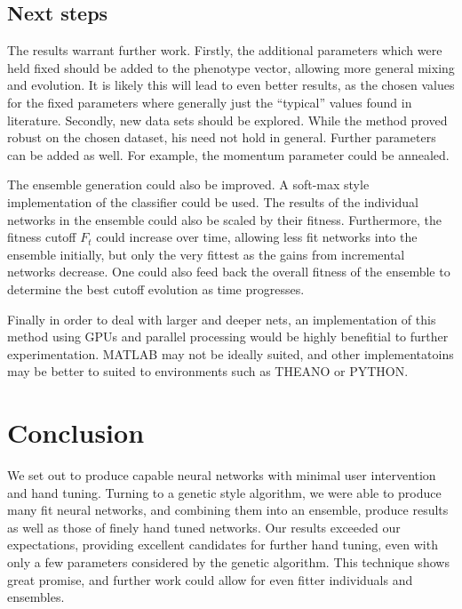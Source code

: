 \documentclass{article}
\DeclareMathOperator{\1}{\mathbbm{1}}
\begin{document}
\subsection{Next steps}
The results warrant further work. Firstly, the additional parameters which were held fixed should be added to the phenotype vector, allowing 
more general mixing and evolution. It is likely this will lead to even better results, as the chosen values for the fixed parameters where 
generally just the ``typical'' values found in literature. Secondly, new data sets should be explored. While the method proved robust on the 
chosen dataset, his need not hold in general. Further parameters can be added as well. For example, the momentum parameter could be annealed. 

The ensemble generation could also be improved. A soft-max style implementation of the classifier could be used. The results of the individual
networks in the ensemble could also be scaled by their fitness. Furthermore, the fitness cutoff $F_t$ could increase over time, allowing less
fit networks into the ensemble initially, but only the very fittest as the gains from incremental networks decrease. One could also feed back 
the overall fitness of the ensemble to determine the best cutoff evolution as time progresses. 

Finally in order to deal with larger and deeper nets, an implementation of this method using GPUs and parallel processing would be highly 
benefitial to further experimentation. MATLAB may not be ideally suited, and other implementatoins may be better to suited to environments 
such as THEANO or PYTHON.


\section{Conclusion}
We set out to produce capable neural networks with minimal user intervention and hand tuning. Turning to a genetic style algorithm, we
were able to produce many fit neural networks, and combining them into an ensemble, produce results as well as those of finely hand tuned
networks. Our results exceeded our expectations, providing excellent candidates for further hand tuning, even with only a few parameters 
considered by the genetic algorithm. This technique shows great promise, and further work could allow for even fitter individuals and 
ensembles.
\end{document}
